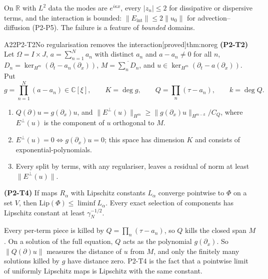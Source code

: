 \documentclass[11pt,a4paper,oneside]{report}
\newcommand{\badge}[2]{\textcolor{#1}{\textsf{\footnotesize[#2]}}}
\newcommand{\proved}{\badge{cC}{proved}}
\newcommand{\led}[1]{\textcolor{cG}{\textsf{\footnotesize(#1)}}}
\newcommand{\R}{\mathbb{R}}\newcommand{\C}{\mathbb{C}}\newcommand{\N}{\mathbb{N}}\newcommand{\Z}{\mathbb{Z}}\newcommand{\Q}{\mathbb{Q}}
\newcommand{\Eint}{E_{\mathrm{int}}}
\newenvironment{dimcard}[5]{\par\Needspace{12\baselineskip}\begin{dimcardbox}{#1}{#2}{#3}{#4}{#5}}{\end{dimcardbox}}
\begin{document}
\begin{caution}[title={Where this does not happen}]
On $\R$ with $L^2$ data the modes are $e^{i\kappa x}$, every $|z_n|\le2$ for dissipative or dispersive terms, and the interaction is bounded: $\|\Eint\|\le2\|u_0\|$ for advection--diffusion \led{P2-P5}. The failure is a feature of \emph{bounded} domains.
\end{caution}

\begin{dimcard}{A22}{P2-T2}{No regularisation removes the interaction}{\proved}{thm:noreg}
\label{dim:P2-T4}%
\textbf{(P2-T2)} Let $\Omega=I\times J$, $a=\sum_{n=1}^Na_n$ with distinct $a_n$ and $a-a_n\ne0$ for all $n$, $D_n=\ker_{H^m}(\partial_t-a_n(\partial_x))$, $M=\overline{\sum_nD_n}$, and $u\in\ker_{H^m}(\partial_t-a(\partial_x))$. Put
\[
g=\prod_{n=1}^N(a-a_n)\in\C[\xi],\qquad K=\deg g,\qquad Q=\prod_n(\tau-a_n),\qquad k=\deg Q .
\]
\begin{enumerate}[label=(\alph*)]
\item $Q(\partial)u=g(\partial_x)u$, and $\|E^\perp(u)\|_{H^m}\ge\|g(\partial_x)u\|_{H^{m-k}}/C_Q$, where $E^\perp(u)$ is the component of $u$ orthogonal to $M$.
\item $E^\perp(u)=0\iff g(\partial_x)u=0$; this space has dimension $K$ and consists of exponential-polynomials.
\item Every split by terms, with any regulariser, leaves a residual of norm at least $\|E^\perp(u)\|$.
\end{enumerate}
\textbf{(P2-T4)} If maps $R_\alpha$ with Lipschitz constants $L_\alpha$ converge pointwise to $\Phi$ on a set $V$, then $\mathrm{Lip}(\Phi)\le\liminf L_\alpha$. Every exact selection of components has Lipschitz constant at least $\gamma_N^{-1/2}$.
\end{dimcard}

\begin{proofidea}
Every per-term piece is killed by $Q=\prod_n(\tau-a_n)$, so $Q$ kills the closed span $M$. On a solution of the full equation, $Q$ acts as the polynomial $g(\partial_x)$. So $\|Q(\partial)u\|$ measures the distance of $u$ from $M$, and only the finitely many solutions killed by $g$ have distance zero. P2-T4 is the fact that a pointwise limit of uniformly Lipschitz maps is Lipschitz with the same constant.
\end{proofidea}
\end{document}
